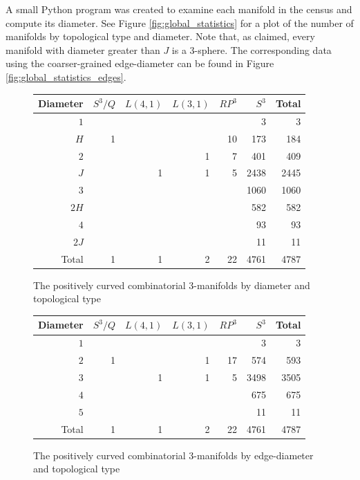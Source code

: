 \documentclass[12pt]{article}
\begin{document}
A small Python program was created to examine each manifold in the census and compute its diameter. See Figure \ref{fig:global_statistics} for a plot of the number of manifolds by topological type and diameter. Note that, as claimed, every manifold with diameter greater than $J$ is a 3-sphere. The corresponding data using the coarser-grained edge-diameter can be found in Figure \ref{fig:global_statistics_edges}. 

\begin{figure}
\centering
\begin{tabular} {| r | r | r | r | r | r | r |}
\hline
Diameter & $S^{3}/Q$ & $L(4,1)$ & $L(3,1)$ & $RP^{3}$ & $S^{3}$ & Total \\
\hline
\hline
$1$&  &  &  &   &3    & 3    \\
$H$&1 &  &  &10 &173  & 184  \\
$2$&  &  &1 &7  &401  & 409  \\
$J$&  &1 &1 &5  &2438 & 2445 \\
$3$&  &  &  &   &1060 & 1060 \\
$2H$&  &  &  &   &582  & 582  \\
$4$&  &  &  &   &93   & 93   \\
$2J$&  &  &  &   &11   & 11   \\
\hline
Total&1 &1 &2 &22   &4761   &4787  \\
\hline
\end{tabular}
\caption{The positively curved combinatorial 3-manifolds by diameter and topological type}
\label{fig:manifold_counts}
\end{figure}

\begin{figure}
\centering
\begin{tabular} {| r | r | r | r | r | r | r |}	
\hline
Diameter & $S^{3}/Q$ & $L(4,1)$ & $L(3,1)$ & $RP^{3}$ & $S^{3}$ & Total \\
\hline
\hline
$1$ &  &  &  &   &3    & 3    \\
$2$ & 1&  &1 &17 &574  & 593  \\
$3$ &  &1 &1 &5  &3498 & 3505 \\
$4$ &  &  &  &   &675  & 675   \\
$5$ &  &  &  &   &11   & 11   \\
\hline
Total&1 &1 &2 &22   &4761   &4787  \\
\hline
\end{tabular}
\caption{The positively curved combinatorial 3-manifolds by edge-diameter and topological type}
\label{fig:manifold_counts_edges}
\end{figure}
\end{document}
